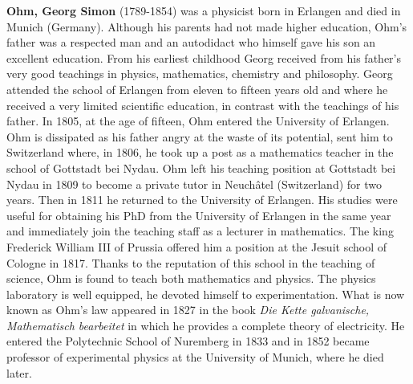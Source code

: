 \textbf{Ohm, Georg Simon} (1789-1854) was a physicist born in Erlangen and died in Munich (Germany). Although his parents had not made higher education, Ohm's father was a respected man and an autodidact who himself gave his son an excellent education. From his earliest childhood Georg received from his father's very good teachings in physics, mathematics, chemistry and philosophy. Georg attended the school of Erlangen from eleven to fifteen years old and where he received a very limited scientific education, in contrast with the teachings of his father. In 1805, at the age of fifteen, Ohm entered the University of Erlangen. Ohm is dissipated as his father angry at the waste of its potential, sent him to Switzerland where, in 1806, he took up a post as a mathematics teacher in the school of Gottstadt bei Nydau. Ohm left his teaching position at Gottstadt bei Nydau in 1809 to become a private tutor in Neuchâtel (Switzerland) for two years. Then in 1811 he returned to the University of Erlangen. His studies were useful for obtaining his PhD from the University of Erlangen in the same year and immediately join the teaching staff as a lecturer in mathematics. The king Frederick William III of Prussia offered him a position at the Jesuit school of Cologne in 1817. Thanks to the reputation of this school in the teaching of science, Ohm is found to teach both mathematics and physics. The physics laboratory is well equipped, he devoted himself to experimentation. What is now known as Ohm's law appeared in 1827 in the book \textit{Die Kette galvanische, Mathematisch bearbeitet} in which he provides a complete theory of electricity. He entered the Polytechnic School of Nuremberg in 1833 and in 1852 became professor of experimental physics at the University of Munich, where he died later.

